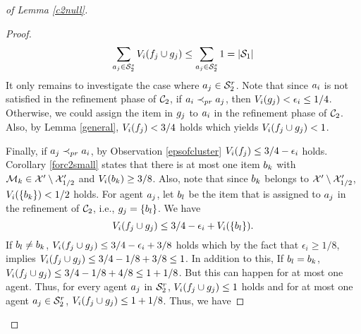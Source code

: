 \begin{proof}[of Lemma \ref{c2null}]
\begin{proof}
\begin{equation}
\label{f}
\sum_{a_j \in \mathcal{S}_2^s} V_i(f_j \cup g_j) \leq \sum_{a_j \in \mathcal{S}_2^s} 1 = |\mathcal{S}_1|
\end{equation}
It only remains to investigate the case where $a_j \in \mathcal{S}_2^r$. Note that since $a_i$ is not satisfied in the refinement phase of $\mathcal{C}_2$, if $a_i \prec_{pr} a_j$, then $V_i(g_j)< \epsilon_i \leq 1/4$. Otherwise, we could assign the item in $g_j$ to $a_i$ in the refinement phase of $\mathcal{C}_2$. Also, by Lemma \ref{general}, $V_i(f_j)<3/4$ holds which yields $V_i(f_j \cup g_j)<1$.  

Finally, if $a_j \prec_{pr} a_i$, by Observation \ref{epsofcluster} $V_i(f_j) \leq 3/4 - \epsilon_i$ holds. Corollary \ref{forc2small} states that there is at most one item $b_k$ with $\mathcal{M}_k \in \mathcal{X}' \setminus \mathcal{X}'_{1/2}$ and $V_i(b_k) \geq 3/8$. Also, note that since $b_k$ belongs to  $\mathcal{X}' \setminus \mathcal{X}'_{1/2}$, $V_i(\{b_k\})<1/2$ holds. For agent $a_j$, let $b_l$ be the item that is assigned to $a_j$ in the refinement of $\mathcal{C}_2$, i.e., $g_j = \{b_l\}$. We have $$V_i(f_j \cup g_j) \leq 3/4 - \epsilon_i + V_i(\{b_l\}).$$  
If $b_l \neq b_k$, $V_i(f_j \cup g_j) \leq 3/4 - \epsilon_i + 3/8$ holds which by the fact that $\epsilon_i \geq{1/8}$, implies $V_i(f_j \cup g_j) \leq 3/4 -1/8 + 3/8 \leq 1$. In addition to this, If $b_l = b_k$, 
$V_i(f_j \cup g_j) \leq 3/4 - 1/8 + 4/8 \leq 1+1/8$. But this can happen for at most one agent. Thus, for every agent $a_j$ in $\mathcal{S}_2^r$, $V_i(f_j \cup g_j) \leq 1$ holds and for at most one agent $a_j \in \mathcal{S}_2^r$, $V_i(f_j \cup g_j) \leq 1+1/8$. Thus, we have


\end{proof}
\end{proof}

